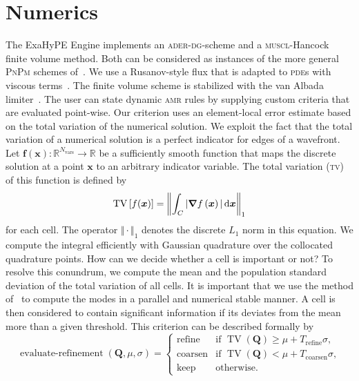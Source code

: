 \documentclass[runningheads]{llncs}
\newcommand{\muscl}{\textsc{muscl}-Hancock}
\newcommand{\aderdg}{\textsc{ader-dg}}
\newcommand{\amr}{\textsc{amr}}
\newcommand{\pde}{\textsc{pde}}
\newcommand{\softwareName}[1]{#1}
\newcommand{\exahypeengine}{\softwareName{ExaHyPE Engine}}
\newcommand{\Q}{\bm{Q}}
\newcommand{\cell}[1][]{C_{#1}}
\newcommand{\intdcell}[1]{\int_{\cell} #1 \dd{\bm{x}}}
\newcommand{\tv}{\operatorname{TV}}
\begin{document}
\section{Numerics}
The \exahypeengine{} implements an \aderdg{}-scheme and a \muscl{} finite volume method.
Both can be considered as instances of the more general \textsc{PnPm} schemes of~\cite{dumbser2008unified}.
We use a Rusanov-style flux that is adapted to \pde{}s with viscous terms~\cite{gassner2008discontinuous,fambri2017space}.
The finite volume scheme is stabilized with the van Albada limiter~\cite{van1997comparative}.
The user can state dynamic \amr{} rules by supplying custom criteria that are evaluated point-wise.
Our criterion uses an element-local error estimate based on the total variation of the numerical solution.
We exploit the fact that the total variation of a numerical solution is a perfect indicator for edges of a wavefront.
Let $\bm{f}(\bm{x}): \mathbb{R}^{N_\text{vars}} \to \mathbb{R}$ be a sufficiently smooth function that maps the discrete solution at a point $\bm{x}$ to an arbitrary indicator variable.
The total variation (\textsc{tv}) of this function is defined by
\begin{equation}
  \label{eq:tv}
  \tv \left[ f(\bm{x}) \right] =
  \left\Vert
\intdcell{ \vert \gradient{f \left( \bm{x} \right)} \vert }
\right\Vert_1
\end{equation}
for each cell.
The operator $\Vert \cdot \Vert_1$ denotes the discrete $L_1$ norm in this equation.
We compute the integral efficiently with Gaussian quadrature over the collocated quadrature points.
\newcommand{\mean}{\mu}%
\newcommand{\std}{\sigma}%
\newcommand{\variance}{\std^2}%
\newcommand{\Trefine}{T_\text{refine}}%
\newcommand{\Tdelete}{T_\text{coarsen}}%
How can we decide whether a cell is important or not?
To resolve this conundrum, we compute the mean and the population standard deviation of the total variation of all cells.
It is important that we use the method of~\cite{chan1982updating} to compute the modes in a parallel and numerical stable manner.
A cell is then considered to contain significant information if its deviates from the mean more than a given threshold.
This criterion can be described formally by
\begin{equation}
  \label{eq:refinement-criterion}
  \operatorname{evaluate-refinement}(\Q, \mu, \sigma) =
  \begin{cases}
    \text{refine} & \text{if } \tv(\Q) \geq \mu + \Trefine \sigma, \\
    \text{coarsen} & \text{if } \tv(\Q) < \mu + \Tdelete \sigma, \\
    \text{keep} & \text{otherwise}.
    \end{cases}
\end{equation}
\end{document}
